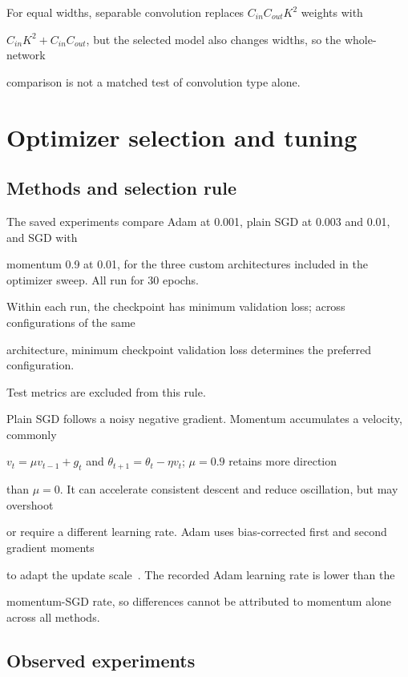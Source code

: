 \documentclass[11pt,a4paper]{article}
\begin{document}
For equal widths, separable convolution replaces $C_{in}C_{out}K^2$ weights with

$C_{in}K^2+C_{in}C_{out}$, but the selected model also changes widths, so the whole-network

comparison is not a matched test of convolution type alone.



\section{Optimizer selection and tuning}

\subsection{Methods and selection rule}

The saved experiments compare Adam at 0.001, plain SGD at 0.003 and 0.01, and SGD with

momentum 0.9 at 0.01, for the three custom architectures included in the optimizer sweep. All run for 30 epochs.

Within each run, the checkpoint has minimum validation loss; across configurations of the same

architecture, minimum checkpoint validation loss determines the preferred configuration.

Test metrics are excluded from this rule.



Plain SGD follows a noisy negative gradient. Momentum accumulates a velocity, commonly

$v_t=\mu v_{t-1}+g_t$ and $\theta_{t+1}=\theta_t-\eta v_t$; $\mu=0.9$ retains more direction

than $\mu=0$. It can accelerate consistent descent and reduce oscillation, but may overshoot

or require a different learning rate. Adam uses bias-corrected first and second gradient moments

to adapt the update scale~\cite{adam}. The recorded Adam learning rate is lower than the

momentum-SGD rate, so differences cannot be attributed to momentum alone across all methods.



\subsection{Observed experiments}
\end{document}
